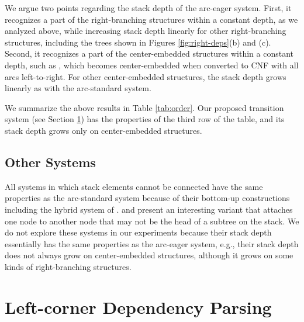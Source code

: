 \documentclass[english]{jnlp_1.4}
\begin{document}
We argue two points regarding the stack depth of the arc-eager system.
First, it recognizes a part of the right-branching structures within a constant depth, as we analyzed above, while increasing stack depth linearly for other right-branching structures, 
    including the trees shown in Figures \ref{fig:right-deps}(b) and (c).
Second, it recognizes a part of the center-embedded structures within a constant depth, such as , which becomes center-embedded when converted to CNF with all arcs left-to-right.
For other center-embedded structures, the stack depth grows linearly as with the arc-standard system.

\begin{table}[b]
\label{tab:order}

\end{table}

We summarize the above results in Table \ref{tab:order}.
\pagebreak
Our proposed transition system (see Section \ref{sec:left-corner}) has the properties of the third row of the table, and its stack depth grows only on center-embedded structures.


\subsection{Other Systems}

All systems in which stack elements cannot be connected have the same properties as the arc-standard system because of their bottom-up constructions including the hybrid system of .
 and  present an interesting variant that attaches one node to another node that may not be the head of a subtree on the stack.
We do not explore these systems in our experiments because their stack depth essentially has the same properties as the arc-eager system, e.g., their stack depth does not always grow on center-embedded structures, although it grows on some kinds of right-branching structures.


\section{Left-corner Dependency Parsing}
\label{sec:left-corner}
\end{document}
